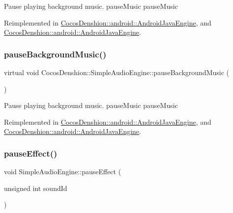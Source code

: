 Pause playing background music.  pause\+Music  pause\+Music 

Reimplemented in \hyperlink{classCocosDenshion_1_1android_1_1AndroidJavaEngine_a0a1f417bca73e4c63e261046948cf23f}{Cocos\+Denshion\+::android\+::\+Android\+Java\+Engine}, and \hyperlink{classCocosDenshion_1_1android_1_1AndroidJavaEngine_a414fc89d87fca8d1a354e893a1117295}{Cocos\+Denshion\+::android\+::\+Android\+Java\+Engine}.

\mbox{\label{classCocosDenshion_1_1SimpleAudioEngine_ab85ae442b45e99bc58bfdbb3a4f66d52}} 
\subsubsection{\texorpdfstring{pause\+Background\+Music()}{pauseBackgroundMusic()}\hspace{0.1cm}{\footnotesize\ttfamily [2/2]}}
{\footnotesize\ttfamily virtual void Cocos\+Denshion\+::\+Simple\+Audio\+Engine\+::pause\+Background\+Music (\begin{DoxyParamCaption}{ }\end{DoxyParamCaption})\hspace{0.3cm}{\ttfamily [virtual]}}

Pause playing background music.  pause\+Music  pause\+Music 

Reimplemented in \hyperlink{classCocosDenshion_1_1android_1_1AndroidJavaEngine_a0a1f417bca73e4c63e261046948cf23f}{Cocos\+Denshion\+::android\+::\+Android\+Java\+Engine}, and \hyperlink{classCocosDenshion_1_1android_1_1AndroidJavaEngine_a414fc89d87fca8d1a354e893a1117295}{Cocos\+Denshion\+::android\+::\+Android\+Java\+Engine}.

\mbox{\label{classCocosDenshion_1_1SimpleAudioEngine_a44346159dae470e131ea1046aca63937}} 
\subsubsection{\texorpdfstring{pause\+Effect()}{pauseEffect()}\hspace{0.1cm}{\footnotesize\ttfamily [1/2]}}
{\footnotesize\ttfamily void Simple\+Audio\+Engine\+::pause\+Effect (\begin{DoxyParamCaption}\item[{unsigned int}]{sound\+Id }\end{DoxyParamCaption})\hspace{0.3cm}{\ttfamily [virtual]}}

